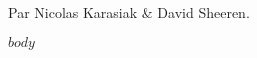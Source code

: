 \documentclass[12]{scrartcl}
\begin{document}
\date{}
\maketitle
Par Nicolas Karasiak \& David Sheeren. 
\\
\tableofcontents
\pagebreak

$body$
\end{document}
